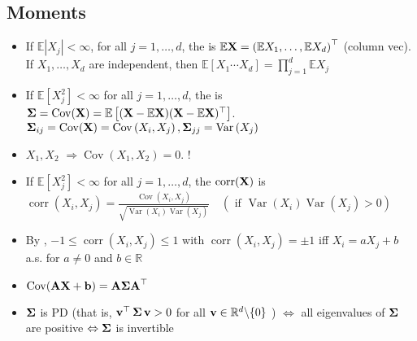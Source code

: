 \subsection*{Moments}
\begin{itemize}[leftmargin=*]
    \item If $\mathbb{E}\left|X_{j}\right|<\infty$, for all $j=1, \ldots, d$, the  is 
$
\mathbb{E} \boldsymbol{\mathbf{X}}=\left(\mathbb{E} X_{1}, \ldots, \mathbb{E} X_{d}\right)^{\top}
$ (column vec). If $X_{1}, \ldots, X_{d}$ are independent, then $\mathbb{E}\left[X_{1} \cdots X_{d}\right]=\prod_{j=1}^{d} \mathbb{E} X_{j}$
    \item If $\mathbb{E}\left[X_{j}^{2}\right]<\infty$ for all $j=1, \ldots, d$, the  is
$
\boldsymbol{\mathbf{\Sigma}} = \operatorname{Cov}(\boldsymbol{\mathbf{X}})=\mathbb{E}\left[(\boldsymbol{\mathbf{X}}-\mathbb{E} \boldsymbol{\mathbf{X}})(\boldsymbol{\mathbf{X}}-\mathbb{E} \boldsymbol{\mathbf{X}})^{\top}\right]
$. 
$
\operatorname{\boldsymbol{\mathbf{\Sigma}}}_{i j}=\operatorname{Cov}(\boldsymbol{\mathbf{X}})=\operatorname{Cov}\left(X_{i}, X_{j}\right), \operatorname{\boldsymbol{\mathbf{\Sigma}}}_{j j}=\operatorname{Var}\left(X_{j}\right)
$
    \item $X_{1}, X_{2}$  $\Rightarrow \operatorname{Cov}\left(X_{1}, X_{2}\right)=0$.  !
    \item If $\mathbb{E}\left[X_{j}^{2}\right]<\infty$ for all $j=1, \ldots, d$, the  $\operatorname{corr}(\boldsymbol{\mathbf{X}})$ is
$
\operatorname{corr}\left(X_{i}, X_{j}\right)=\frac{\operatorname{Cov}\left(X_{i}, X_{j}\right)}{\sqrt{\operatorname{Var}\left(X_{i}\right) \operatorname{Var}\left(X_{j}\right)}} \quad\left(\text { if } \operatorname{Var}\left(X_{i}\right) \operatorname{Var}\left(X_{j}\right)>0\right)
$
    \item By ,
$
-1 \leq \operatorname{corr}\left(X_{i}, X_{j}\right) \leq 1
$
with $\operatorname{corr}\left(X_{i}, X_{j}\right)=\pm 1$ iff $X_{i}=a X_{j}+b$ a.s. for $a \neq 0$ and $b \in \mathbb{R}$
    \item $\operatorname{Cov}(\boldsymbol{\mathbf{AX}}+\boldsymbol{\mathbf{b}})=\boldsymbol{\mathbf{A \Sigma}} \boldsymbol{\mathbf{A}}^{\top}$
    \item $\operatorname{\boldsymbol{\mathbf{\Sigma}}}$ is PD (that is, $\operatorname{\boldsymbol{\mathbf{v}}}^{\operatorname{\top}} \operatorname{\boldsymbol{\mathbf{\Sigma}}} \operatorname{\boldsymbol{\mathbf{v}}}>0$ for all $\operatorname{\boldsymbol{\mathbf{v}}} \in \mathbb{R}^{d} \backslash\{0\}$ ) $\Leftrightarrow$ all eigenvalues of $\operatorname{\boldsymbol{\mathbf{\Sigma}}}$ are positive $\Leftrightarrow \operatorname{\boldsymbol{\mathbf{\Sigma}}}$ is invertible
\end{itemize}







